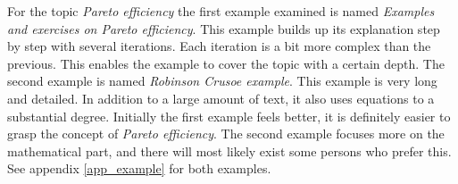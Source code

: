 For the topic \textit{Pareto efficiency} the first example examined is named \textit{Examples and exercises on Pareto efficiency}. This example builds up its explanation step by step with several iterations. Each iteration is a bit more complex than the previous. This enables the example to cover the topic with a certain depth. The second example is named \textit{Robinson Crusoe example}. This example is very long and detailed. In addition to a large amount of text, it also uses equations to a substantial degree. Initially the first example feels better, it is definitely easier to grasp the concept of \textit{Pareto efficiency}. The second example focuses more on the mathematical part, and there will most likely exist some persons who prefer this. See appendix \ref{app_example} for both examples.


\cleardoublepage